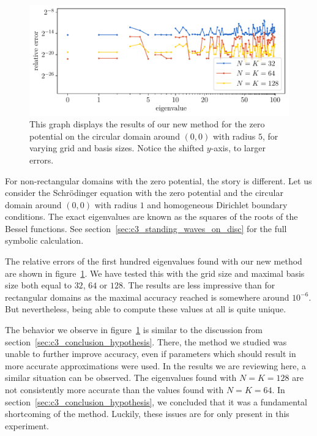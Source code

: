\begin{figure}
    \begin{center}
        \includegraphics[width=\textwidth]{img/chapter4/nm_test_zero_disc.pdf}
    \end{center}
    \caption{This graph displays the results of our new method for the zero potential on the circular domain around $(0, 0)$ with radius $5$, for varying grid and basis sizes. Notice the shifted $y$-axis, to larger errors.}
    \label{fig:c4_nm_zero_test_disc}
\end{figure}

For non-rectangular domains with the zero potential, the story is different. Let us consider the Schrödinger equation with the zero potential and the circular domain around $(0, 0)$ with radius $1$ and homogeneous Dirichlet boundary conditions. The exact eigenvalues are known as the squares of the roots of the Bessel functions. See section~\ref{sec:c3_standing_waves_on_disc} for the full symbolic calculation.

The relative errors of the first hundred eigenvalues found with our new method are shown in figure~\ref{fig:c4_nm_zero_test_disc}. We have tested this with the grid size and maximal basis size both equal to $32$, $64$ or $128$. The results are less impressive than for rectangular domains as the maximal accuracy reached is somewhere around $10^{-6}$. But nevertheless, being able to compute these values at all is quite unique.

The behavior we observe in figure~\ref{fig:c4_nm_zero_test_disc} is similar to the discussion from section~\ref{sec:c3_conclusion_hypothesis}. There, the method we studied was unable to further improve accuracy, even if parameters which should result in more accurate approximations were used. In the results we are reviewing here, a similar situation can be observed. The eigenvalues found with $N=K=128$ are not consistently more accurate than the values found with $N=K=64$. In section~\ref{sec:c3_conclusion_hypothesis}, we concluded that it was a fundamental shortcoming of the method. Luckily, these issues are for \strands{} only present in this experiment.


